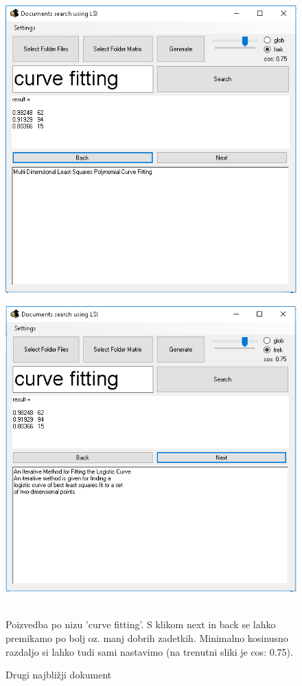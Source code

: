 \documentclass{article}
\begin{document}
\begin{figure}
\begin{minipage}{.5\textwidth}
    \includegraphics[width=\linewidth,left]{UI002}
    \label{slika:UI2}
\end{minipage}%
\begin{minipage}{.5\textwidth}
    \includegraphics[width=\linewidth,right]{UI003}
    \caption{Drugi najbližji dokument }
    \label{slika:UI3}
\end{minipage} \\
 Poizvedba po nizu 'curve fitting'. S klikom next in back se lahko premikamo po bolj oz. manj dobrih zadetkih. Minimalno kosinusno razdaljo si lahko tudi sami nastavimo (na trenutni sliki je cos: 0.75). 
\end{figure}
\end{document}
